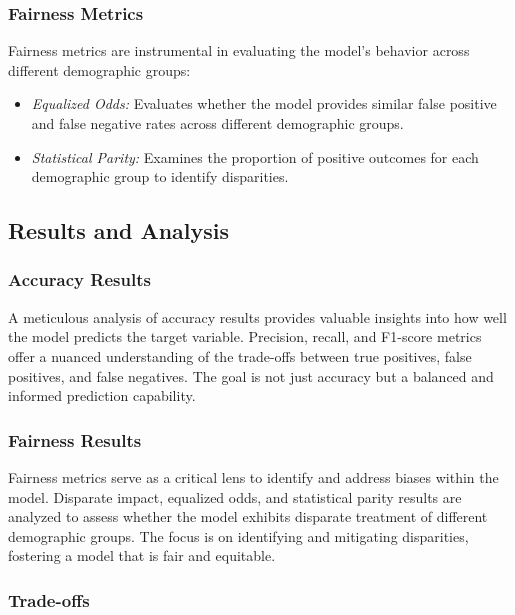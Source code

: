 \documentclass[12pt,a4paper,openright,twoside]{book}
\begin{document}
\subsubsection{Fairness Metrics}

Fairness metrics are instrumental in evaluating the model's behavior across different demographic groups:

\begin{itemize}
    
    \item \emph{Equalized Odds:} Evaluates whether the model provides similar false positive and false negative rates across different demographic groups.
    
    \item \emph{Statistical Parity:} Examines the proportion of positive outcomes for each demographic group to identify disparities.
\end{itemize}

\subsection{Results and Analysis}

\subsubsection{Accuracy Results}

A meticulous analysis of accuracy results provides valuable insights into how well the model predicts the target variable. Precision, recall, and F1-score metrics offer a nuanced understanding of the trade-offs between true positives, false positives, and false negatives. The goal is not just accuracy but a balanced and informed prediction capability.

\subsubsection{Fairness Results}

Fairness metrics serve as a critical lens to identify and address biases within the model. Disparate impact, equalized odds, and statistical parity results are analyzed to assess whether the model exhibits disparate treatment of different demographic groups. The focus is on identifying and mitigating disparities, fostering a model that is fair and equitable.

\subsubsection{Trade-offs}
\end{document}

